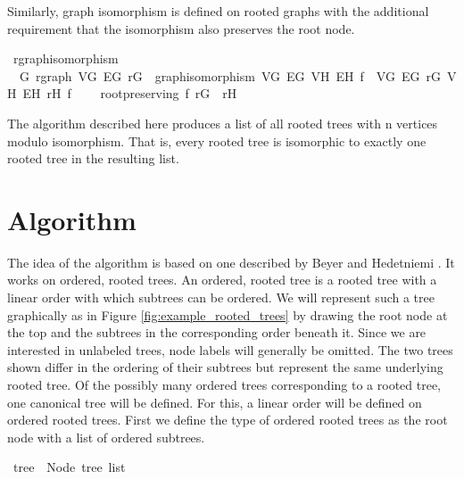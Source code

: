 Similarly, graph isomorphism is defined on rooted graphs with the additional requirement that the isomorphism also preserves the root node.

\begin{isabellebox}
    \isamarkupfalse%
    \ rgraph{\isacharunderscore}{\kern0pt}isomorphism\ {\isacharequal}{\kern0pt}\isanewline
    \ \ G{\isacharcolon}{\kern0pt}\ rgraph\ V\isactrlsub G\ E\isactrlsub G\ r\isactrlsub G\ {\isacharplus}{\kern0pt}\ graph{\isacharunderscore}{\kern0pt}isomorphism\ V\isactrlsub G\ E\isactrlsub G\ V\isactrlsub H\ E\isactrlsub H\ f\ \ V\isactrlsub G\ E\isactrlsub G\ r\isactrlsub G\ V\isactrlsub H\ E\isactrlsub H\ r\isactrlsub H\ f\ {\isacharplus}{\kern0pt}\isanewline
    \ \ \ root{\isacharunderscore}{\kern0pt}preserving{\isacharcolon}{\kern0pt}\ {\isachardoublequoteopen}f\ r\isactrlsub G\ {\isacharequal}{\kern0pt}\ r\isactrlsub H{\isachardoublequoteclose}
\end{isabellebox}

The algorithm described here produces a list of all rooted trees with n vertices modulo isomorphism.
That is, every rooted tree is isomorphic to exactly one rooted tree in the resulting list.


\section{Algorithm}

The idea of the algorithm is based on one described by Beyer and Hedetniemi \parencite{beyer}.
It works on ordered, rooted trees.
An ordered, rooted tree is a rooted tree with a linear order with which subtrees can be ordered.
We will represent such a tree graphically as in Figure \ref{fig:example_rooted_trees} by drawing the root node at the top and the subtrees in the corresponding order beneath it.
Since we are interested in unlabeled trees, node labels will generally be omitted.
The two trees shown differ in the ordering of their subtrees but represent the same underlying rooted tree.
Of the possibly many ordered trees corresponding to a rooted tree, one canonical tree will be defined.
For this, a linear order will be defined on ordered rooted trees.
First we define the type of ordered rooted trees as the root node with a list of ordered subtrees.

\begin{isabellebox}
\isamarkupfalse%
\ tree\ {\isacharequal}{\kern0pt}\ Node\ {\isachardoublequoteopen}tree\ list{\isachardoublequoteclose}
\end{isabellebox}


